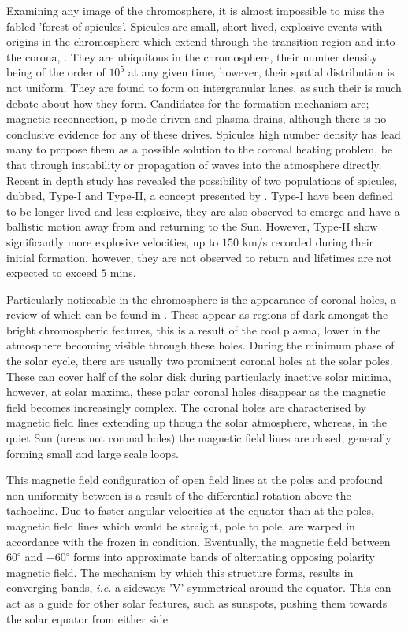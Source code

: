 Examining any image of the chromosphere, it is almost impossible to miss the fabled 'forest of spicules'.
Spicules are small, short-lived, explosive events with origins in the chromosphere which extend through the transition region and into the corona, \cite{Beckers1972}.
They are ubiquitous in the chromosphere, their number density being of the order of $10^5$ at any given time, however, their spatial distribution is not uniform.
They are found to form on intergranular lanes, as such their is much debate about how they form.
Candidates for the formation mechanism are; magnetic reconnection, p-mode driven and plasma drains, although there is no conclusive evidence for any of these drives.
Spicules high number density has lead many to propose them as a possible solution to the coronal heating problem, be that through instability or propagation of waves into the atmosphere directly.
Recent in depth study has revealed the possibility of two populations of spicules, dubbed, Type-I and Type-II, a concept presented by \cite{DePontieu2007}.
Type-I have been defined to be longer lived and less explosive, they are also observed to emerge and have a ballistic motion away from and returning to the Sun.
However, Type-II show significantly more explosive velocities, up to $150$ km/s recorded during their initial formation, however, they are not observed to return and lifetimes are not expected to exceed $5$ mins. 

Particularly noticeable in the chromosphere is the appearance of coronal holes, a review of which can be found in \cite{Cranmer2009}.
These appear as regions of dark amongst the bright chromospheric features, this is a result of the cool plasma, lower in the atmosphere becoming visible through these holes.
During the minimum phase of the solar cycle, there are usually two prominent coronal holes at the solar poles. 
These can cover half of the solar disk during particularly inactive solar minima, however, at solar maxima, these polar coronal holes disappear as the magnetic field becomes increasingly complex.
The coronal holes are characterised by magnetic field lines extending up though the solar atmosphere, whereas, in the quiet Sun (areas not coronal holes) the magnetic field lines are closed, generally forming small and large scale loops.

This magnetic field configuration of open field lines at the poles and profound non-uniformity between is a result of the differential rotation above the tachocline.
Due to faster angular velocities at the equator than at the poles, magnetic field lines which would be straight, pole to pole, are warped in accordance with the frozen in condition.
Eventually, the magnetic field between $60^\circ$ and $-60^\circ$ forms into approximate bands of alternating opposing polarity magnetic field.
The mechanism by which this structure forms, results in converging bands, \emph{i.e.} a sideways 'V' symmetrical around the equator.
This can act as a guide for other solar features, such as sunspots, pushing them towards the solar equator from either side.

